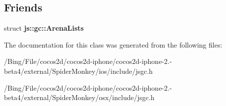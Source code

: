 \subsection*{Friends}
\begin{DoxyCompactItemize}
\item 
\hypertarget{classjs_1_1_g_c_helper_thread_a0661fb559fe509d3c5f0b2807af98e54}{struct {\bfseries js\-::gc\-::\-Arena\-Lists}}\label{classjs_1_1_g_c_helper_thread_a0661fb559fe509d3c5f0b2807af98e54}

\end{DoxyCompactItemize}


The documentation for this class was generated from the following files\-:\begin{DoxyCompactItemize}
\item 
/\-Bing/\-File/cocos2d/cocos2d-\/iphone/cocos2d-\/iphone-\/2.-\/beta4/external/\-Spider\-Monkey/ios/include/jsgc.\-h\item 
/\-Bing/\-File/cocos2d/cocos2d-\/iphone/cocos2d-\/iphone-\/2.-\/beta4/external/\-Spider\-Monkey/osx/include/jsgc.\-h\end{DoxyCompactItemize}
